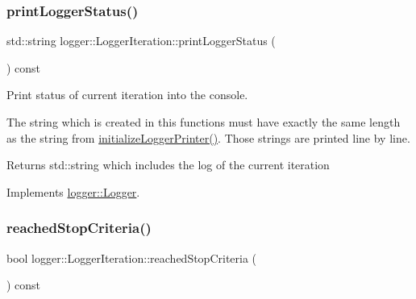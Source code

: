 \mbox{\label{classlogger_1_1_logger_iteration_ac6283092f495a6e8c5ab357ae84cb911}} 
\subsubsection{\texorpdfstring{print\+Logger\+Status()}{printLoggerStatus()}}
{\footnotesize\ttfamily std\+::string logger\+::\+Logger\+Iteration\+::print\+Logger\+Status (\begin{DoxyParamCaption}{ }\end{DoxyParamCaption}) const\hspace{0.3cm}{\ttfamily [virtual]}}



Print status of current iteration into the console. 

The string which is created in this functions must have exactly the same length as the string from {\ttfamily \mbox{\hyperlink{classlogger_1_1_logger_iteration_a051c69a2577e023160ec8ccd080dd59f}{initialize\+Logger\+Printer()}}}. Those strings are printed line by line.

\begin{DoxyReturn}{Returns}
{\ttfamily std\+::string} which includes the log of the current iteration 
\end{DoxyReturn}


Implements \mbox{\hyperlink{classlogger_1_1_logger_abad818a7e8053ca84cb267e883b5e377}{logger\+::\+Logger}}.

\mbox{\label{classlogger_1_1_logger_iteration_af4cd1f0b87dcff8a88439f2ca6b07f1f}} 
\subsubsection{\texorpdfstring{reached\+Stop\+Criteria()}{reachedStopCriteria()}}
{\footnotesize\ttfamily bool logger\+::\+Logger\+Iteration\+::reached\+Stop\+Criteria (\begin{DoxyParamCaption}{ }\end{DoxyParamCaption}) const\hspace{0.3cm}{\ttfamily [virtual]}}



